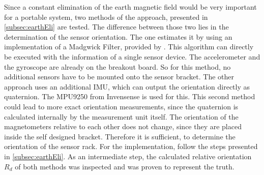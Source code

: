 Since a constant elimination of the earth magnetic field would be very important for a portable system, two methods of the approach, presented in \ref{subsec:earthEli} are tested. The difference between those two lies in the determination of the sensor orientation. The one estimates it by using an implementation of a Madgwick Filter, provided by \cite{mikeshub2012}. This algorithm can directly be executed with the information of a single sensor device. The accelerometer and the gyroscope are already on the breakout board. So for this method, no additional sensors have to be mounted onto the sensor bracket. The other approach uses an additional \ac{IMU}, which can output the orientation directly as quaternion. The MPU9250 from Invensense \cite{MPU2014} is used for this. This second method could lead to more exact orientation measurements, since the quaternion is calculated internally by the measurement unit itself. The orientation of the magnetometers relative to each other does not change, since they are placed inside the self designed bracket. Therefore it is sufficient, to determine the orientation of the sensor rack. For the implementation, follow the steps presented in \ref{subsec:earthEli}. As an intermediate step, the calculated relative orientation $ R_{d} $ of both methods was inspected and was proven to represent the truth.

